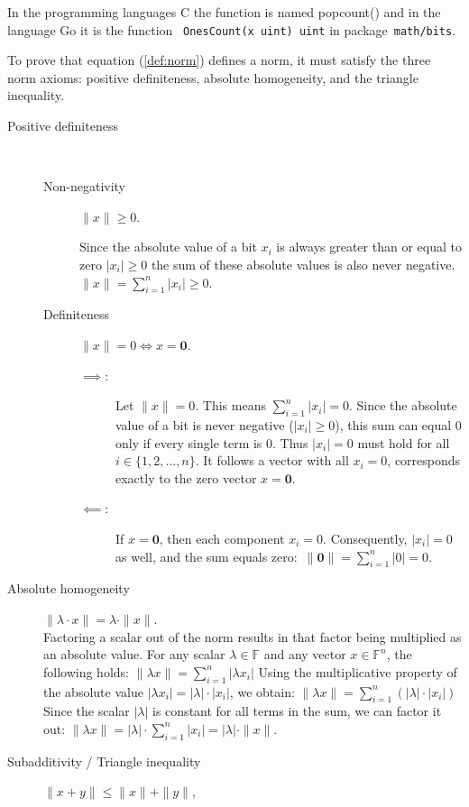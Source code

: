 \documentclass[a4paper]{article}
\newcommand{\BF}{\mathbb{F}}
\newcommand{\0}{\mathbf{0}}
\newcommand{\1}{\mathbf{1}}
\begin{document}
In the programming languages C the function is named popcount() and in the language Go it is the
function  ~\texttt{OnesCount(x~uint)~uint} in package~\texttt{math/bits}.

To prove that equation (\ref{def:norm}) defines a norm, it must satisfy the three norm axioms: positive definiteness,
absolute homogeneity, and the triangle inequality.
\begin{description}
\item[Positive definiteness] \
\begin{description}
\item[Non-negativity] $\| x \| \ge 0$.

Since the absolute value of a bit $x_i$ is always greater than or equal to zero $|x_i| \ge 0$ the
sum of these absolute values is also never negative. $\|x\| = \sum_{i=1}^{n} |x_i| \ge 0$.
\item[Definiteness] $\| x \| = 0 \Leftrightarrow x = \0$.
\begin{description}
\item[$\implies :$]Let $\|x\| = 0$. This means $\sum_{i=1}^{n} |x_i| = 0$.
Since the absolute value of a bit is never negative ($|x_i| \ge 0$),
this sum can equal $0$ only if every single term is $0$.
Thus $|x_i| = 0$ must hold for all $i \in \{1, 2, \dots, n\}$.
It follows a vector with all $x_i = 0$, corresponds exactly to the zero vector $x = \0$.
\item[$\impliedby $:] If $x = \0$, then each component $x_i = 0$. Consequently, $|x_i| = 0$ as well,
and the sum equals zero:~$\|\0\| = \sum_{i=1}^{n} |0| = 0$.
\end{description}
\end{description}
\item[Absolute homogeneity] $ \| \lambda \cdot x\| = \lambda \cdot \| x\|$. \\
Factoring a scalar out of the norm results in that factor being multiplied as an absolute value.
For any scalar $\lambda \in \BF$ and any vector $x \in \BF^n$,
the following holds: $\|\lambda x\| = \sum_{i=1}^{n} |\lambda x_i|$
Using the multiplicative property of the absolute value
$|\lambda x_i| = |\lambda| \cdot |x_i|$,
we obtain: $\|\lambda x\| = \sum_{i=1}^{n} (|\lambda| \cdot |x_i|)$
Since the scalar $|\lambda|$ is constant for all terms in the sum,
we can factor it out: $\|\lambda x\| = |\lambda| \cdot \sum_{i=1}^{n} |x_i| = |\lambda| \cdot \|x\|$.
\item[Subadditivity / Triangle inequality] $\|x + y\| \le \| x \| + \| y \|$, \\

\end{description}
\end{document}
